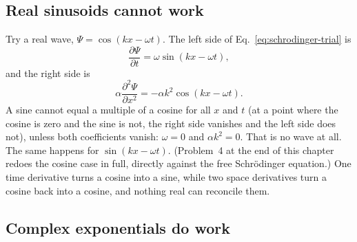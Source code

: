 \subsection{Real sinusoids cannot work}

Try a real wave, $\Psi=\cos(kx-\omega t)$. The left side of Eq.~\eqref{eq:schrodinger-trial} is
\[
\frac{\partial\Psi}{\partial t}=\omega\sin(kx-\omega t),
\]
and the right side is
\[
\alpha\frac{\partial^2\Psi}{\partial x^2}=-\alpha k^2\cos(kx-\omega t).
\]
A sine cannot equal a multiple of a cosine for all $x$ and $t$ (at a point where the cosine is zero and the sine is not, the right side vanishes and the left side does not), unless both coefficients vanish: $\omega=0$ and $\alpha k^2=0$. That is no wave at all. The same happens for $\sin(kx-\omega t)$. (Problem~4 at the end of this chapter redoes the cosine case in full, directly against the free Schr\"odinger equation.) One time derivative turns a cosine into a sine, while two space derivatives turn a cosine back into a cosine, and nothing real can reconcile them.

\subsection{Complex exponentials do work}

